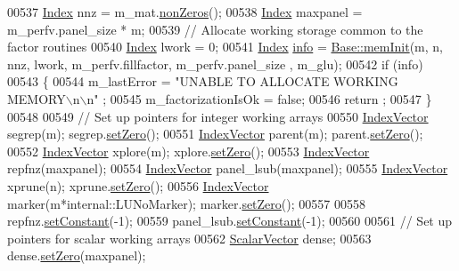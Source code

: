 \begin{DoxyCode}
00537   \hyperlink{namespace_eigen_a62e77e0933482dafde8fe197d9a2cfde}{Index} nnz = m\_mat.\hyperlink{group___sparse_core___module_a03de8b3da2c142ce8698a76123b3e7d3}{nonZeros}();
00538   \hyperlink{namespace_eigen_a62e77e0933482dafde8fe197d9a2cfde}{Index} maxpanel = m\_perfv.panel\_size * m;
00539   \textcolor{comment}{// Allocate working storage common to the factor routines}
00540   \hyperlink{namespace_eigen_a62e77e0933482dafde8fe197d9a2cfde}{Index} lwork = 0;
00541   \hyperlink{namespace_eigen_a62e77e0933482dafde8fe197d9a2cfde}{Index} \hyperlink{group___sparse_l_u___module_ab0d0c1744ffd5a1dff578a44bcef2a3d}{info} = \hyperlink{group___sparse_l_u___module_ac018b8ed9664d4e19e34f1ff2d6c578a}{Base::memInit}(m, n, nnz, lwork, m\_perfv.fillfactor, m\_perfv.panel\_size
      , m\_glu); 
00542   \textcolor{keywordflow}{if} (info) 
00543   \{
00544     m\_lastError = \textcolor{stringliteral}{"UNABLE TO ALLOCATE WORKING MEMORY\(\backslash\)n\(\backslash\)n"} ;
00545     m\_factorizationIsOk = \textcolor{keyword}{false};
00546     return ; 
00547   \}
00548   
00549   \textcolor{comment}{// Set up pointers for integer working arrays }
00550   \hyperlink{group___core___module}{IndexVector} segrep(m); segrep.\hyperlink{class_eigen_1_1_plain_object_base_ac21ad5f989f320e46958b75ac8d9a1da}{setZero}();
00551   \hyperlink{group___core___module}{IndexVector} parent(m); parent.\hyperlink{class_eigen_1_1_plain_object_base_ac21ad5f989f320e46958b75ac8d9a1da}{setZero}();
00552   \hyperlink{group___core___module}{IndexVector} xplore(m); xplore.\hyperlink{class_eigen_1_1_plain_object_base_ac21ad5f989f320e46958b75ac8d9a1da}{setZero}();
00553   \hyperlink{group___core___module}{IndexVector} repfnz(maxpanel);
00554   \hyperlink{group___core___module}{IndexVector} panel\_lsub(maxpanel);
00555   \hyperlink{group___core___module}{IndexVector} xprune(n); xprune.\hyperlink{class_eigen_1_1_plain_object_base_ac21ad5f989f320e46958b75ac8d9a1da}{setZero}();
00556   \hyperlink{group___core___module}{IndexVector} marker(m*internal::LUNoMarker); marker.\hyperlink{class_eigen_1_1_plain_object_base_ac21ad5f989f320e46958b75ac8d9a1da}{setZero}();
00557   
00558   repfnz.\hyperlink{class_eigen_1_1_plain_object_base_ac8dea1df3d92b752cc683ff42abf6f9b}{setConstant}(-1); 
00559   panel\_lsub.\hyperlink{class_eigen_1_1_plain_object_base_ac8dea1df3d92b752cc683ff42abf6f9b}{setConstant}(-1);
00560   
00561   \textcolor{comment}{// Set up pointers for scalar working arrays }
00562   \hyperlink{group___core___module}{ScalarVector} dense; 
00563   dense.\hyperlink{class_eigen_1_1_plain_object_base_ac21ad5f989f320e46958b75ac8d9a1da}{setZero}(maxpanel);

\end{DoxyCode}
